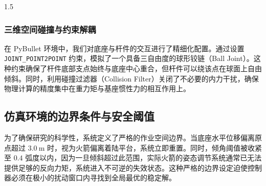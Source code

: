 \documentclass[zihao=-4]{ctexart}
\begin{document}
\begin{spacing}{1.5}
\subsubsection{三维空间碰撞与约束解耦}
在 PyBullet 环境中，我们对底座与杆件的交互进行了精细化配置。通过设置 \texttt{JOINT\_POINT2POINT} 约束，模拟了一个具备三自由度的球形铰链（Ball Joint）。这种约束确保了杆件底部支点始终与底座中心重合，但杆件可以绕该点在球面上自由倾斜。同时，利用碰撞过滤器（Collision Filter）关闭了不必要的内力干扰，确保物理计算的精度集中在重力矩与基座惯性力的相互作用上。

\subsection{仿真环境的边界条件与安全阈值}
为了确保研究的科学性，系统定义了严格的作业空间边界。当底座水平位移偏离原点超过 $3.0\ \mathrm{m}$ 时，视为火箭偏离着陆平台，系统立即重置。同时，倾角阈值被收紧至 $0.4$ 弧度以内，因为一旦倾斜超过此范围，实际火箭的姿态调节系统通常已无法提供足够的反向力矩，系统进入不可逆的失效状态。这种严格的边界设定迫使控制器必须在极小的扰动窗口内寻找到全局最优的稳定解。

\end{spacing}
\end{document}
